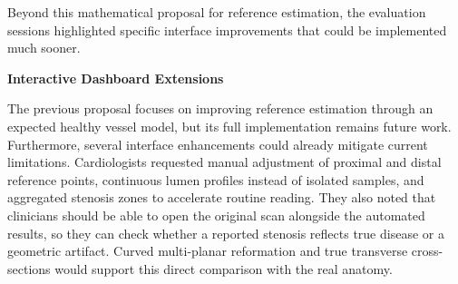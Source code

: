 Beyond this mathematical proposal for reference estimation, the evaluation sessions highlighted specific interface improvements that could be implemented much sooner.

\vspace{0.75em}
\noindent\textbf{Interactive Dashboard Extensions}\par
\vspace{0.4em}
\noindent
The previous proposal focuses on improving reference estimation through an expected healthy vessel model, but its full implementation remains future work. Furthermore, several interface enhancements could already mitigate current limitations. Cardiologists requested manual adjustment of proximal and distal reference points, continuous lumen profiles instead of isolated samples, and aggregated stenosis zones to accelerate routine reading. They also noted that clinicians should be able to open the original scan alongside the automated results, so they can check whether a reported stenosis reflects true disease or a geometric artifact. Curved multi-planar reformation and true transverse cross-sections would support this direct comparison with the real anatomy.

\setlength{\parskip}{0pt plus 1pt}
\setlength{\parindent}{15pt}
